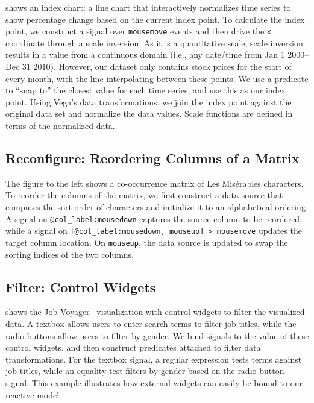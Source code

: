  shows an index chart: a line chart that interactively
normalizes time series to show percentage change based on the current index
point. To calculate the index point, we construct a signal over
\texttt{mousemove} events and then drive the \texttt{x} coordinate through a
scale inversion. As it is a quantitative scale, scale inversion results in a
value from a continuous domain (i.e., any date/time from Jan 1 2000--Dec 31
2010). However, our dataset only contains stock prices for the start of every
month, with the line interpolating between these points. We use a predicate to
``snap to'' the closest value for each time series, and use this as our index
point. Using Vega's data transformations, we join the index point against the
original data set and normalize the data values. Scale functions are defined in
terms of the normalized data.

\subsection{Reconfigure: Reordering Columns of a Matrix}


The figure to the left shows a co-occurrence matrix of Les Mis\'{e}rables
characters. To reorder the columns of the matrix, we first construct a data
source that computes the sort order of characters and initialize it to an
alphabetical ordering. A signal on \texttt{@col\_label:mousedown} captures the
source column to be reordered, while a signal on \texttt{[@col\_label:mousedown,
mouseup] > mousemove} updates the target column location. On \texttt{mouseup},
the data source is updated to swap the sorting indices of the two columns.

\subsection{Filter: Control Widgets}

 shows the Job Voyager~\cite{heer:voyagers}
visualization with control widgets to filter the visualized data. A textbox
allows users to enter search terms to filter job titles, while the radio buttons
allow users to filter by gender. We bind signals to the value of these control
widgets, and then construct predicates attached to filter data transformations.
For the textbox signal, a regular expression tests terms against job titles,
while an equality test filters by gender based on the radio button signal. This
example illustrates how external widgets can easily be bound to our reactive
model.

